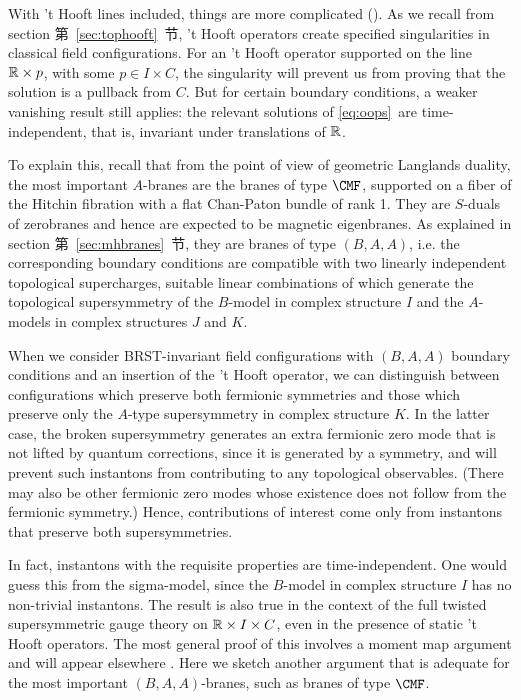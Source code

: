 With 't Hooft lines included, things are more complicated
(\botampo). As we recall from section 第~\ref{sec:tophooft}~节, 't Hooft
operators create specified singularities in classical field
configurations. For an 't Hooft operator supported on the line
$\Bbb{R}\times p$, with some $p\in I\times C$, the singularity
will prevent us from  proving that the solution is a pullback from
$C$.  But for certain boundary conditions, a weaker vanishing
result still applies: the relevant solutions of \eqref{eq:oops}\ are
time-independent, that is, invariant under translations of
$\Bbb{R}$.

To explain this, recall that from the point of view of geometric
Langlands duality, the most important $A$-branes  are the branes
of type ${\CMF}$, supported on a fiber of the Hitchin fibration
with a flat Chan-Paton bundle of rank 1. They are $S$-duals of
zerobranes and hence are expected to be magnetic eigenbranes. As
explained in section 第~\ref{sec:mhbranes}~节, they are branes of type $(B,A,A)$,
i.e. the corresponding boundary conditions are compatible with two
linearly independent topological supercharges, suitable linear
combinations of which generate the topological supersymmetry of
the $B$-model in complex structure $I$ and the $A$-models in
complex structures $J$ and $K$.

When we consider BRST-invariant field configurations with
$(B,A,A)$ boundary conditions and an insertion of the 't Hooft
operator, we can distinguish between configurations which preserve
both fermionic symmetries and those which preserve only the
$A$-type  supersymmetry in complex structure $K$. In the latter
case, the broken supersymmetry generates an extra fermionic zero
mode that is not lifted by quantum corrections, since it is
generated by a symmetry, and will prevent such instantons from
contributing to any topological observables. (There may also be
other fermionic zero modes whose existence does not follow from
the fermionic symmetry.)  Hence, contributions of interest come
only from instantons that preserve both supersymmetries.

In fact, instantons with the requisite properties are
time-independent. One would guess this from the sigma-model, since
the $B$-model in complex structure $I$ has no non-trivial
instantons.  The result is also true in the context of the full
twisted supersymmetric gauge theory on $\Bbb{R}\times I\times C$,
even in the presence of static 't Hooft operators.  The most
general proof of this involves a moment map argument and will
appear elsewhere \cite{ref26}. Here we sketch another argument that is
adequate for the most important $(B,A,A)$-branes, such as branes
of type ${\CMF}$.

